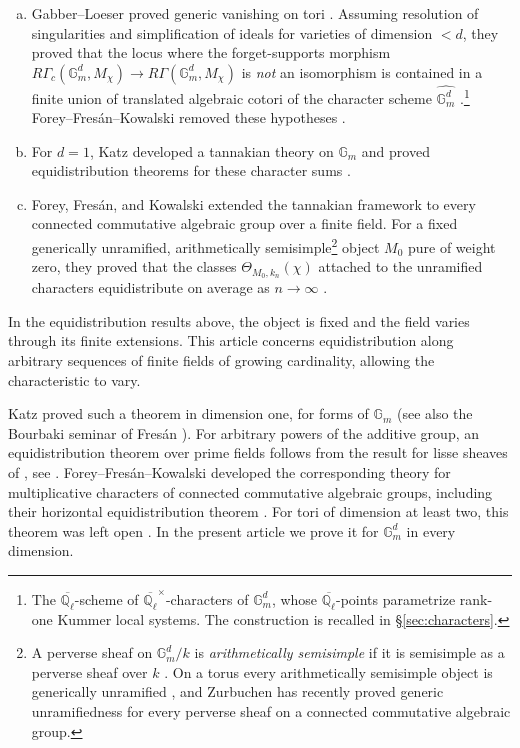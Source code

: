 \documentclass[12pt,reqno]{amsart}
\theoremstyle{definition}
\theoremstyle{plain}
\theoremstyle{definition}
\theoremstyle{remark}
\newcommand{\bbG}{\mathbb{G}}  \newcommand{\bbH}{\mathbb{H}}
\newcommand{\bbQ}{\mathbb{Q}}  \newcommand{\bbR}{\mathbb{R}}
\newcommand{\ol}[1]{\overline{#1}}
\newcommand{\Ql}{\bbQ_{\ell}}
\newcommand{\Gm}{\bbG_m}
\begin{document}
\begin{enumerate}[(a)]

\item Gabber--Loeser proved generic vanishing on tori \cite[Cor.~2.3.2]{GabberLoeser1996}.  Assuming
resolution of singularities and simplification of ideals for varieties of dimension \(<d\), they proved
that the locus where the forget-supports morphism
\(R\Gamma_c(\Gm^d,M_\chi)\to R\Gamma(\Gm^d,M_\chi)\) is \emph{not} an isomorphism is contained in a
finite union of translated algebraic cotori of the character scheme
\(\widehat{\Gm^d}\) \cite[Th.~4.1.1']{GabberLoeser1996}.\footnote{The
\(\ol\Ql\)-scheme of \(\ol\Ql^{\times}\)-characters of \(\Gm^d\), whose \(\ol\Ql\)-points parametrize
rank-one Kummer local systems.  The construction is recalled in \S\ref{sec:characters}.}
Forey--Fres\'an--Kowalski removed these hypotheses \cite[Th.~2.12]{ForeyFresanKowalski2021}.

\item For \(d=1\), Katz developed a tannakian theory on \(\Gm\) and proved equidistribution theorems for
these character sums \cite{Katz2012}.

\item Forey, Fres\'an, and Kowalski \cite{ForeyFresanKowalski2021} extended the tannakian framework to
every connected commutative algebraic group over a finite field.  For a fixed generically unramified,
arithmetically semisimple\footnote{A perverse sheaf on \(\Gm^d/k\) is \emph{arithmetically semisimple}
if it is semisimple as a perverse sheaf over \(k\) \cite[\S1.12]{ForeyFresanKowalski2021}.  On a torus
every arithmetically semisimple object is generically unramified
\cite[Th.~3.27]{ForeyFresanKowalski2021}, and Zurbuchen \cite{Zurbuchen2026} has recently proved generic
unramifiedness for every perverse sheaf on a connected commutative algebraic group.} object \(M_0\) pure
of weight zero,
they proved that the classes
\(\Theta_{M_0,k_n}(\chi)\) attached to the unramified characters equidistribute on average as
\(n\to\infty\) \cite[Th.~4.11]{ForeyFresanKowalski2021}.

\end{enumerate}

In the equidistribution results above, the object is fixed and the field varies through its finite
extensions.  This article concerns equidistribution along arbitrary sequences of finite fields of
growing cardinality, allowing the characteristic to vary.

Katz proved such a theorem in dimension one, for forms of \(\Gm\)
\cite[Th.~28.1]{Katz2012} (see also the Bourbaki seminar of Fres\'an \cite{FresanBourbaki2019}).  For
arbitrary powers of the additive group, an equidistribution theorem over prime fields follows from
the result for lisse sheaves of \cite[Th.~7.22]{SFFK23}, see
\cite[Rem.~4.20(1)]{ForeyFresanKowalski2021}.  Forey--Fres\'an--Kowalski developed the
corresponding theory for multiplicative characters of connected commutative algebraic groups, including
their horizontal equidistribution theorem \cite[Th.~4.19]{ForeyFresanKowalski2021}.  For tori of
dimension at least two, this theorem was left open
\cite[Rem.~4.20(2)]{ForeyFresanKowalski2021}.  In the present article we prove it for \(\Gm^d\) in every
dimension.
\end{document}
